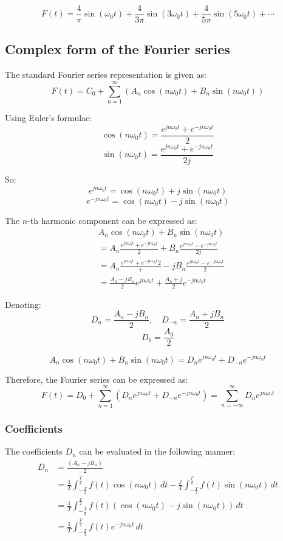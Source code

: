 \documentclass[11pt]{article}
\begin{document}
\[F(t) = \frac{4}{\pi} \sin(\omega_0 t) + \frac{4}{3 \pi} \sin (3 \omega_0 t) + \frac{4}{5 \pi} \sin (5 \omega_0 t) + \cdots\]

 \newpage
\subsection{Complex form of the Fourier series}
\label{sec:org0a8a428}
The standard Fourier series representation is given as:
\[F(t) = C_0 + \sum_{n = 1}^{\infty} (A_n \cos (n \omega_0 t) + B_n \sin (n \omega_0 t))\]

Using Euler's formulae:
\[\cos (n \omega_0 t) = \frac{e^{jn \omega_0 t} + e^{-jn \omega_0 t}}{2}\]
\[\sin (n \omega_0 t) = \frac{e^{jn \omega_0 t} + e^{-jn \omega_0 t}}{2j}\]

So:
\[e^{jn \omega_0 t} = \cos(n \omega_0 t) + j \sin{(n \omega_0 t)}\]
\[e^{-jn \omega_0 t} = \cos(n \omega_0 t) - j \sin{(n \omega_0 t)}\]

The \(n\)-th harmonic component can be expressed as:
\begin{align*}
&A_n \cos (n \omega_0 t) + B_n \sin(n \omega_0 t) \\
&= A_n \frac{e^{jn \omega_0 t} + e^{-jn \omega_0 t}}{2} + B_n \frac{e^{jn \omega_0 t} - e^{-jn \omega_0 t}}{2j} \\
&= A_n \frac{e^{jn \omega_0 t} + e^{-jn \omega_0 t}{2}} + -j B_n \frac{e^{jn \omega_0 t} - e^{-jn \omega_0 t}}{2} \\
&= \frac{A_n - j B_n}{2} e^{jn \omega_0 t} + \frac{A_n + j}{2} e^{-jn \omega_0 t}
\end{align*}

Denoting:
\[D_n = \frac{A_n - j B_n}{2}, \quad D_{-n} = \frac{A_n + j B_n}{2}\]
\[D_0 = \frac{A_0}{2}\]

\[A_n \cos (n \omega_0 t) + B_n \sin (n \omega_0 t) = D_n e^{jn \omega_0 t} + D_{-n} e^{-jn \omega_0 t}\]

Therefore, the Fourier series can be expressed as:
\[F(t) = D_0 + \sum_{n = 1}^{\infty} (D_n e^{jn \omega_0 t} + D_{-n} e^{-jn \omega_0 t}) = \sum_{n = -\infty}^{\infty} D_n e^{jn \omega_0 t}\]
\subsubsection{Coefficients}
\label{sec:org4651da8}
The coefficients \(D_n\) can be evaluated in the following manner:
\begin{align*}
D_n &= \frac{(A_n - j B_n)}{2} \\
&= \frac{1}{T} \int_{-\frac{T}{2}}^{\frac{T}{2}} f(t) \cos (n \omega_0 t) \, dt - \frac{j}{T} \int_{-\frac{T}{2}}^{\frac{T}{2}} f(t) \sin(n \omega_0 t) \, dt \\
&= \frac{1}{T} \int_{-\frac{T}{2}}^{\frac{T}{2}} f(t) (\cos (n \omega_0 t) - j \sin (n \omega_0 t)) \, dt \\
&= \frac{1}{T} \int_{-\frac{T}{2}}^{\frac{T}{2}} f(t) e^{-jn \omega_0 t} \, dt
\end{align*}
\end{document}
